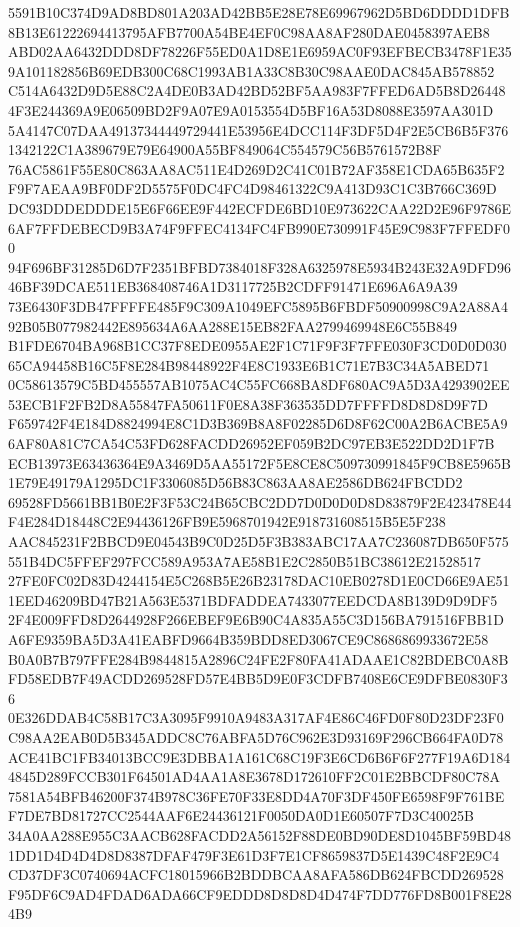 \documentclass[UTF8,fontset=fandol,zihao=-4,a4paper]{ctexart}
\begin{document}
{{5591B10C374D9AD8BD801A203AD42BB5E28E78E69967962D5BD6DDDD1DFB8B13E61222694413795AFB7700A54BE4EF0C98AA8AF280DAE0458397AEB8
ABD02AA6432DDD8DF78226F55ED0A1D8E1E6959AC0F93EFBECB3478F1E359A101182856B69EDB300C68C1993AB1A33C8B30C98AAE0DAC845AB578852
C514A6432D9D5E88C2A4DE0B3AD42BD52BF5AA983F7FFED6AD5B8D264484F3E244369A9E06509BD2F9A07E9A0153554D5BF16A53D8088E3597AA301D
5A4147C07DAA49137344449729441E53956E4DCC114F3DF5D4F2E5CB6B5F3761342122C1A389679E79E64900A55BF849064C554579C56B5761572B8F
76AC5861F55E80C863AA8AC511E4D269D2C41C01B72AF358E1CDA65B635F2F9F7AEAA9BF0DF2D5575F0DC4FC4D98461322C9A413D93C1C3B766C369D
DC93DDDEDDDE15E6F66EE9F442ECFDE6BD10E973622CAA22D2E96F9786E6AF7FFDEBECD9B3A74F9FFEC4134FC4FB990E730991F45E9C983F7FFEDF00
94F696BF31285D6D7F2351BFBD7384018F328A6325978E5934B243E32A9DFD9646BF39DCAE511EB368408746A1D3117725B2CDFF91471E696A6A9A39
73E6430F3DB47FFFFE485F9C309A1049EFC5895B6FBDF50900998C9A2A88A492B05B077982442E895634A6AA288E15EB82FAA2799469948E6C55B849
B1FDE6704BA968B1CC37F8EDE0955AE2F1C71F9F3F7FFE030F3CD0D0D03065CA94458B16C5F8E284B98448922F4E8C1933E6B1C71E7B3C34A5ABED71
0C58613579C5BD455557AB1075AC4C55FC668BA8DF680AC9A5D3A4293902EE53ECB1F2FB2D8A55847FA50611F0E8A38F363535DD7FFFFD8D8D8D9F7D
F659742F4E184D8824994E8C1D3B369B8A8F02285D6D8F62C00A2B6ACBE5A96AF80A81C7CA54C53FD628FACDD26952EF059B2DC97EB3E522DD2D1F7B
ECB13973E63436364E9A3469D5AA55172F5E8CE8C509730991845F9CB8E5965B1E79E49179A1295DC1F3306085D56B83C863AA8AE2586DB624FBCDD2
69528FD5661BB1B0E2F3F53C24B65CBC2DD7D0D0D0D8D83879F2E423478E44F4E284D18448C2E94436126FB9E5968701942E918731608515B5E5F238
AAC845231F2BBCD9E04543B9C0D25D5F3B383ABC17AA7C236087DB650F575551B4DC5FFEF297FCC589A953A7AE58B1E2C2850B51BC38612E21528517
27FE0FC02D83D4244154E5C268B5E26B23178DAC10EB0278D1E0CD66E9AE511EED46209BD47B21A563E5371BDFADDEA7433077EEDCDA8B139D9D9DF5
2F4E009FFD8D2644928F266EBEF9E6B90C4A835A55C3D156BA791516FBB1DA6FE9359BA5D3A41EABFD9664B359BDD8ED3067CE9C8686869933672E58
B0A0B7B797FFE284B9844815A2896C24FE2F80FA41ADAAE1C82BDEBC0A8BFD58EDB7F49ACDD269528FD57E4BB5D9E0F3CDFB7408E6CE9DFBE0830F36
0E326DDAB4C58B17C3A3095F9910A9483A317AF4E86C46FD0F80D23DF23F0C98AA2EAB0D5B345ADDC8C76ABFA5D76C962E3D93169F296CB664FA0D78
ACE41BC1FB34013BCC9E3DBBA1A161C68C19F3E6CD6B6F6F277F19A6D1844845D289FCCB301F64501AD4AA1A8E3678D172610FF2C01E2BBCDF80C78A
7581A54BFB46200F374B978C36FE70F33E8DD4A70F3DF450FE6598F9F761BEF7DE7BD81727CC2544AAF6E24436121F0050DA0D1E60507F7D3C40025B
34A0AA288E955C3AACB628FACDD2A56152F88DE0BD90DE8D1045BF59BD481DD1D4D4D4D8D8387DFAF479F3E61D3F7E1CF8659837D5E1439C48F2E9C4
CD37DF3C0740694ACFC18015966B2BDDBCAA8AFA586DB624FBCDD269528F95DF6C9AD4FDAD6ADA66CF9EDDD8D8D8D4D474F7DD776FD8B001F8E284B9
}}
\end{document}
